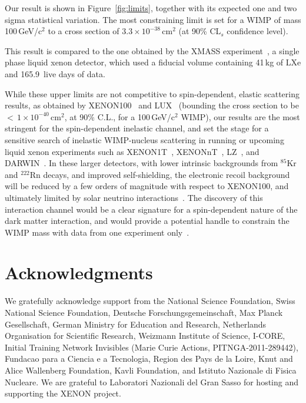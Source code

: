 Our result is shown in Figure~\ref{fig:limits}, together with its expected one and two sigma statistical variation.
The most constraining limit is  set for a WIMP of mass 100\,GeV/c$^2$ to a cross section of $3.3 \times 10^{-38}$\,cm$^{2}$ (at 90\% CL$_s$ confidence level). 

This result is compared to the one obtained by the XMASS experiment~\cite{Uchida:2014cnn}, a single phase liquid xenon detector, which used a fiducial volume containing 41\,kg of LXe and 165.9~live days of data. 


While these upper limits are not competitive to spin-dependent, elastic scattering results, as obtained by XENON100~\cite{Aprile:2013doa} and LUX~\cite{Akerib:2016lao} 
(bounding the cross section to be $<\,1 \times 10^{-40}$\,cm$^{2}$, at 90\% C.L.,  for a 100\,GeV/c$^2$ WIMP), 
our results are the most stringent for the spin-dependent inelastic channel, and set the stage for a sensitive search of inelastic WIMP-nucleus scattering in running or upcoming liquid xenon experiments such as XENON1T~\cite{Aprile:2015uzo}, XENONnT~\cite{Aprile:2015uzo},  LZ~\cite{Akerib:2015cja}, and DARWIN~\cite{Aalbers:2016jon}. In these larger detectors, with lower intrinsic backgrounds from $^{85}$Kr and $^{222}$Rn decays, and improved self-shielding, the electronic recoil background will be reduced by a few orders of magnitude with respect to XENON100, and ultimately limited by solar neutrino interactions~\cite{Baudis:2013qla}. 
The discovery of this interaction channel would be a clear signature for a spin-dependent nature of the dark matter interaction, and would provide a potential handle  to constrain the WIMP mass with data from one experiment only~\cite{Baudis:2013bba,McCabe:2016aof}.

\section*{Acknowledgments}
We gratefully acknowledge support from the National Science Foundation, Swiss National Science Foundation, Deutsche Forschungsgemeinschaft, Max Planck Gesellschaft, German Ministry for Education and Research, Netherlands Organisation for Scientific Research, Weizmann Institute of Science, I-CORE, Initial Training Network Invisibles (Marie Curie Actions, PITNGA-2011-289442), Fundacao para a Ciencia e a Tecnologia, Region des Pays de la Loire, Knut and Alice Wallenberg Foundation, Kavli Foundation, and Istituto Nazionale di Fisica Nucleare. We are grateful to Laboratori Nazionali del Gran Sasso for hosting and supporting the XENON project.
